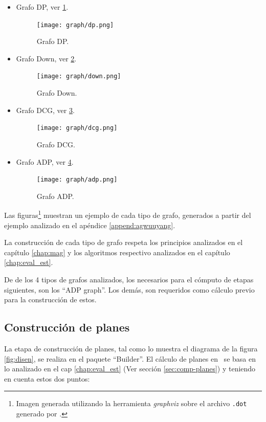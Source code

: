 \begin{itemize}
\item Grafo DP, ver \ref{dpgraph}.
  \begin{figure}[h!]\centering
    \texttt{[image: graph/dp.png]}
  \caption{\label{dpgraph} Grafo DP.}
  \end{figure}

\item Grafo Down, ver \ref{downgraph}.
  \begin{figure}[h!]\centering
    \texttt{[image: graph/down.png]}
  \caption{\label{downgraph} Grafo Down.}
  \end{figure}

\item Grafo DCG, ver \ref{dcggraph}.
  \begin{figure}[h!]\centering
    \texttt{[image: graph/dcg.png]}
  \caption{\label{dcggraph} Grafo DCG.}
  \end{figure}

\item Grafo ADP, ver \ref{adpgraph}.
  \begin{figure}[h!]\centering
    \texttt{[image: graph/adp.png]}
  \caption{\label{adpgraph} Grafo ADP.}
  \end{figure}
\end{itemize}

Las figuras\footnote{\label{foot:graph} Imagen generada utilizando la herramienta \textit{graphviz} sobre el archivo \texttt{.dot} generado por \maggen.} muestran un ejemplo de cada tipo de grafo, generados a partir del ejemplo analizado en el apéndice \ref{append:agwuuyang}.

La construcción de cada tipo de grafo respeta los principios analizados en el capítulo \ref{chap:mag} y los algoritmos respectivo analizados en el capítulo  \ref{chap:eval_est}. 

De de los 4 tipos de grafos analizados, los necesarios para el cómputo de etapas siguientes, son los ``ADP graph''. Los demás, son requeridos como cálculo previo para la construcción de estos.

\subsection*{Construcción de planes}

La etapa de construcción de planes, tal como lo muestra el diagrama de la figura \ref{fig:disen}, se realiza en el paquete ``Builder''. El cálculo de planes en \maggen\ se basa en lo analizado en el cap \ref{chap:eval_est} (Ver sección \ref{sec:comp-planes}) y teniendo en cuenta estos dos puntos:


